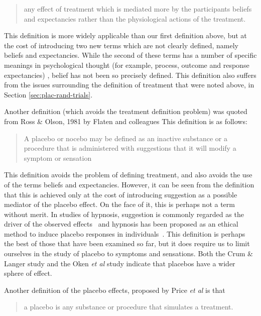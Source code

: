 \begin{quotation}
  any effect of treatment which is mediated more by the participants
  beliefs and expectancies rather than the physiological actions of
  the treatment.
\end{quotation}

This definition is more widely applicable than our first definition above, but at the cost of introducing two new terms which are not clearly defined, namely beliefs and expectancies. While the second of these terms has a number of specific meanings in psychological thought (for example, process, outcome and response expectancies) \cite{Bandura1977,Kirsch1985}, belief has not been so precisely defined. This definition also suffers from the issues surrounding the definition of treatment that were noted above, in Section \ref{sec:plac-rand-trials}. 



Another definition (which avoids the treatment definition problem) was quoted from Ross \& Olson, 1981 by Flaten and colleagues \cite{Flaten1999}
This definition is as follows:

\begin{quotation}
  A placebo or nocebo may be defined as an inactive
substance or a procedure that is administered with
suggestions that it will modify a symptom or sensation
\end{quotation}

This definition avoids the problem of defining treatment, and also avoids the use of the terms beliefs and expectancies. However, it can be seen from the definition that this is achieved only at the cost of introducing suggestion as a possible mediator of the placebo effect. On the face of it, this is perhaps not a term without merit. In studies of hypnosis, suggestion is commonly regarded as the driver of the observed effects~\cite{Kirsch1994} and hypnosis has been proposed as an ethical method to induce placebo responses in individuals~\cite{Raz2007a}. This definition is perhaps the best of those that have been examined so far, but it does require us to limit ourselves in the study of placebo to symptoms and sensations. Both the Crum \& Langer study and the Oken {\it et al\/} study indicate that placebos have a wider sphere of effect. 


Another definition of the placebo effects,  proposed by Price {\it et al\/} \cite{Price2008} is that

\begin{quotation}
  a placebo is any substance or procedure that simulates a treatment.
\end{quotation}

